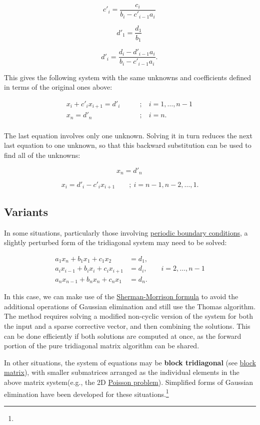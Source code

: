 \documentclass[]{article}
\begin{document}
\[c'_i = \frac{c_i}{b_i - c'_{i - 1} a_i}\,\]

\[d'_1 = \frac{d_1}{b_1}\,\]

\[d'_i = \frac{d_i - d'_{i - 1} a_i}{b_i - c'_{i - 1} a_i}.\,\]

This gives the following system with the same unknowns and coefficients
defined in terms of the original ones above:

\[\begin{array}{lcl}
x_i + c'_i x_{i + 1} = d'_i \qquad &;& \ i = 1, \ldots, n - 1 \\
x_n = d'_n \qquad &;& \ i = n. \\
\end{array}
\,\]

The last equation involves only one unknown. Solving it in turn reduces
the next last equation to one unknown, so that this backward
substitution can be used to find all of the unknowns:

\[x_n = d'_n\,\]

\[x_i = d'_i - c'_i x_{i + 1} \qquad ; \ i = n - 1, n - 2, \ldots, 1.\]

\subsection{Variants}\label{variants}

In some situations, particularly those involving
\href{periodic_boundary_conditions}{periodic boundary conditions}, a
slightly perturbed form of the tridiagonal system may need to be solved:

\[\begin{align}
a_1 x_{n}  + b_1 x_1  + c_1 x_2  & = d_1, \\
a_i x_{i - 1}  + b_i x_i  + c_i x_{i + 1}  & = d_i,\quad\quad i = 2,\ldots,n-1 \\
a_n x_{n-1}  + b_n x_n  + c_n x_1  & = d_n.
\end{align}\]

In this case, we can make use of the
\href{Sherman-Morrison_formula}{Sherman-Morrison formula} to avoid the
additional operations of Gaussian elimination and still use the Thomas
algorithm. The method requires solving a modified non-cyclic version of
the system for both the input and a sparse corrective vector, and then
combining the solutions. This can be done efficiently if both solutions
are computed at once, as the forward portion of the pure tridiagonal
matrix algorithm can be shared.

In other situations, the system of equations may be \textbf{block
tridiagonal} (see \href{block_matrix}{block matrix}), with smaller
submatrices arranged as the individual elements in the above matrix
system(e.g., the 2D
\href{Poisson_equation_discretized_into_block_tridiagonal}{Poisson
problem}). Simplified forms of Gaussian elimination have been developed
for these situations.\footnote{}
\end{document}
